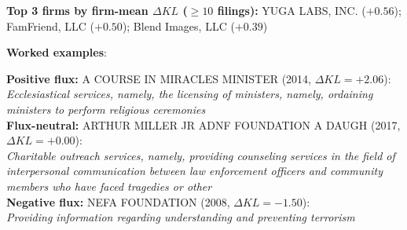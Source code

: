 \textbf{Top 3 firms by firm-mean $\Delta KL$ ($\geq 10$ filings):} YUGA LABS, INC. ($+0.56$); FamFriend, LLC ($+0.50$); Blend Images, LLC ($+0.39$)

\textbf{Worked examples}:

  \textbf{Positive flux:} \textsc{A COURSE IN MIRACLES MINISTER} (2014, $\Delta KL=+2.06$):\\
  \textit{Ecclesiastical services, namely, the licensing of ministers, namely, ordaining ministers to perform religious ceremonies}\\
  \textbf{Flux-neutral:} \textsc{ARTHUR MILLER JR ADNF FOUNDATION A DAUGH} (2017, $\Delta KL=+0.00$):\\
  \textit{Charitable outreach services, namely, providing counseling services in the field of interpersonal communication between law enforcement officers and community members who have faced tragedies or other}\\
  \textbf{Negative flux:} \textsc{NEFA FOUNDATION} (2008, $\Delta KL=-1.50$):\\
  \textit{Providing information regarding understanding and preventing terrorism}\\
